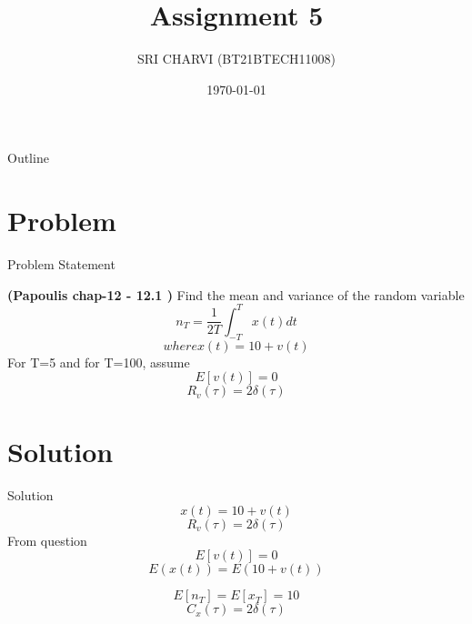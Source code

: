 \documentclass{beamer}
\title{Assignment 5 }
\author{SRI CHARVI (BT21BTECH11008)}
\date{\today}
\begin{document}
\begin{frame}
    \titlepage 
\end{frame}

\begin{frame}{Outline}
    \tableofcontents
\end{frame}


\section{Problem}
\begin{frame}{Problem Statement}

\textbf{(Papoulis chap-12 - 12.1 )}
Find the mean and variance of the random variable
\begin{equation*}
    n_{T} = \dfrac{1}{2T}\int_{-T}^{T}x(t)dt
\end{equation*}
\begin{equation*}
  where x(t)=10+v(t)  
\end{equation*}
For T=5 and for T=100, assume
\begin{equation*}
    E[v(t)] = 0 
\end{equation*}
        \begin{equation*}
            R_v(\tau) = 2\delta(\tau)
        \end{equation*}                          

\end{frame}


\section{Solution}
\begin{frame}{Solution}
\begin{equation}
    x(t)=10+v(t) 
\end{equation}
\begin{equation}
      R_v(\tau) = 2\delta(\tau)
\end{equation}
From question
\begin{equation}
     E[v(t)] = 0
\end{equation}
\begin{equation}
    E(x(t)) = E( 10 + v(t) )
    \end{equation}
    
\begin{equation}
    E[n_{T}] = E[x_{T}] = 10
\end{equation}
\begin{equation}
        C_{x}(\tau) = 2\delta(\tau)
\end{equation}
\end{frame} 
\end{document}
